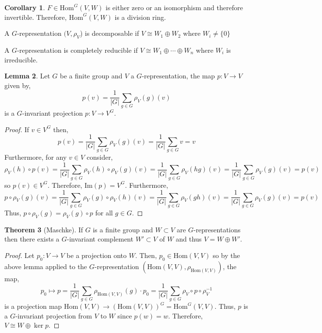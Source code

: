 \documentclass[12pt]{extarticle}
\renewcommand{\Im}[1]{\mathrm{Im}(#1)}
\newcommand{\Hom}[2]{\mathrm{Hom}\left( #1, #2 \right)}
\newcommand{\repHom}[3]{\mathrm{Hom}^{#1} \left( #2, #3 \right)}
\theoremstyle{definition}
\newtheorem{theorem}{Theorem}[section]
\newtheorem{lemma}[theorem]{Lemma}
\newtheorem{corollary}[theorem]{Corollary}
\newenvironment{definition}[1][Definition:]{\begin{trivlist}
\item[\hskip \labelsep {\bfseries #1}]}{\end{trivlist}}
\begin{document}
\begin{corollary}
$F \in \repHom{G}{V}{W}$ is either zero or an isomorphism and therefore invertible. Therefore, $\repHom{G}{V}{W}$ is a division ring. 
\end{corollary}

\begin{definition}
A $G$-representation $(V, \rho_V$) is decomposable if $V \cong W_1 \oplus W_2$ where $W_i \neq \{0\}$
\end{definition}

\begin{definition}
A $G$-representation is completely reducible if $V \cong W_1 \oplus \cdots \oplus  W_n$ where $W_i$ is irreducible. 
\end{definition}

\begin{lemma}
Let $G$ be a finite group and $V$ a $G$-representation, the map $p : V \to V$ given by, 
\[ p(v) = \frac{1}{|G|} \sum_{g \in G} \rho_V(g)(v)\]
is a $G$-invariant projection $p : V \to V^G$. 
\end{lemma}

\begin{proof}
If $v \in V^G$ then,
\[p(v) = \frac{1}{|G|} \sum\limits_{g \in G} \rho_V(g)(v) = \frac{1}{|G|} \sum\limits_{g \in G} v = v\]
Furthermore, for any $v \in V$ consider,
\[ \rho_V(h) \circ p (v) = \frac{1}{|G|} \sum\limits_{g \in G} \rho_V(h) \circ \rho_V(g)(v) = \frac{1}{|G|} \sum\limits_{g \in G} \rho_V(hg)(v) = \frac{1}{|G|} \sum\limits_{g \in G} \rho_V(g)(v) = p(v)\]
so $p(v) \in V^G$. Therefore, $\Im{p} = V^G$. Furthermore,
\[ p \circ \rho_V(g) (v) = \frac{1}{|G|} \sum\limits_{g \in G}  \rho_V(g) \circ  \rho_V(h) (v) = \frac{1}{|G|} \sum\limits_{g \in G} \rho_V(gh)(v) = \frac{1}{|G|} \sum\limits_{g \in G} \rho_V(g)(v) = p(v)\]
Thus, $p \circ \rho_V(g) = \rho_V(g) \circ p$ for all $g \in G$.
\end{proof}

\begin{theorem}[Maschke]
If $G$ is a finite group and $W \subset V$ are $G$-representations then there exists a $G$-invariant complement $W' \subset V$ of $W$ and thus $V = W \oplus W'$.
\end{theorem}

\begin{proof}
Let $p_0 : V \to V$ be a projection onto $W$. Then, $p_0 \in \Hom{V}{V}$ so by the above lemma applied to the $G$-representation $(\Hom{V}{V}, \rho_{\Hom{V}{V}})$, the map,
\[p_0 \mapsto p = \frac{1}{|G|} \sum\limits_{g \in G} \rho_{\Hom{V}{V}}(g) \cdot p_0 = \frac{1}{|G|} \sum\limits_{g \in G} \rho_V \circ p \circ \rho_V^{-1}\]
is a projection map $\Hom{V}{V} \to (\Hom{V}{V})^G = \repHom{G}{V}{V}$. Thus,
$p$ is a $G$-invariant projection from $V$ to $W$ since $p(w) = w$. Therefore, $V \cong W \oplus \ker{p}$.   
\end{proof}
\end{document}
